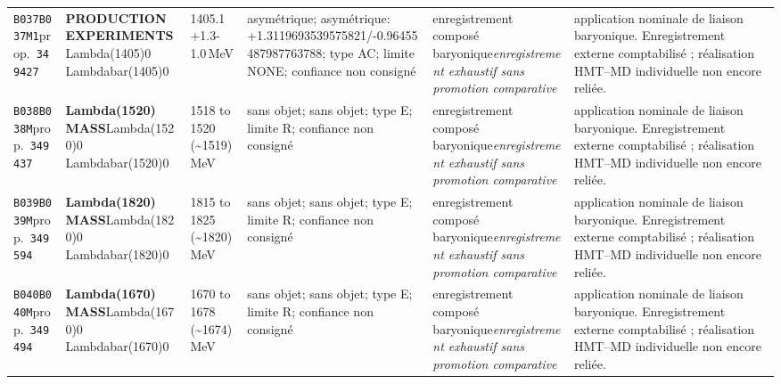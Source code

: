 \begin{landscape}
\begin{longtable}{L{1.85cm}L{4.45cm}L{2.35cm}L{4.05cm}L{3.35cm}L{7.15cm}}
\texttt{B037}\newline \texttt{B037M1}\newline prop.\ \texttt{349427} & \textbf{PRODUCTION EXPERIMENTS}\newline Lambda(1405)0 \textbar{}\allowbreak{} Lambdabar(1405)0 & 1405.1+1.3-1.0\,MeV & asymétrique; asymétrique: +1.3119693539575821/-0.96455487987763788; type AC; limite NONE; confiance non consigné & enregistrement composé baryonique\newline \emph{enregistrement exhaustif sans promotion comparative} & application nominale de liaison baryonique. Enregistrement externe comptabilisé ; réalisation HMT--MD individuelle non encore reliée. \\
\texttt{B038}\newline \texttt{B038M}\newline prop.\ \texttt{349437} & \textbf{Lambda(1520) MASS}\newline Lambda(1520)0 \textbar{}\allowbreak{} Lambdabar(1520)0 & 1518 to 1520 (\textasciitilde{}1519)\,MeV & sans objet; sans objet; type E; limite R; confiance non consigné & enregistrement composé baryonique\newline \emph{enregistrement exhaustif sans promotion comparative} & application nominale de liaison baryonique. Enregistrement externe comptabilisé ; réalisation HMT--MD individuelle non encore reliée. \\
\texttt{B039}\newline \texttt{B039M}\newline prop.\ \texttt{349594} & \textbf{Lambda(1820) MASS}\newline Lambda(1820)0 \textbar{}\allowbreak{} Lambdabar(1820)0 & 1815 to 1825 (\textasciitilde{}1820)\,MeV & sans objet; sans objet; type E; limite R; confiance non consigné & enregistrement composé baryonique\newline \emph{enregistrement exhaustif sans promotion comparative} & application nominale de liaison baryonique. Enregistrement externe comptabilisé ; réalisation HMT--MD individuelle non encore reliée. \\
\texttt{B040}\newline \texttt{B040M}\newline prop.\ \texttt{349494} & \textbf{Lambda(1670) MASS}\newline Lambda(1670)0 \textbar{}\allowbreak{} Lambdabar(1670)0 & 1670 to 1678 (\textasciitilde{}1674)\,MeV & sans objet; sans objet; type E; limite R; confiance non consigné & enregistrement composé baryonique\newline \emph{enregistrement exhaustif sans promotion comparative} & application nominale de liaison baryonique. Enregistrement externe comptabilisé ; réalisation HMT--MD individuelle non encore reliée. \\

\end{longtable}
\end{landscape}
